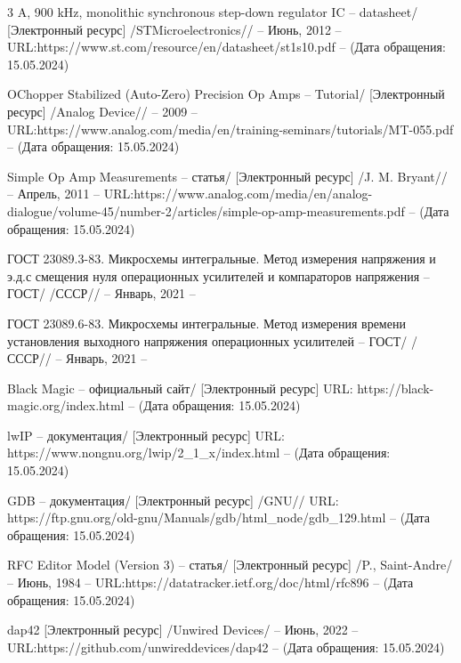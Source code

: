 \begin{thebibliography}{00}
 3 A, 900 kHz, monolithic synchronous step-down regulator IC
 -- datasheet/
  [Электронный ресурс]
 /STMicroelectronics// -- Июнь, 2012 -- 
 URL:https://www.st.com/resource/en/datasheet/st1s10.pdf --
 (Дата обращения: 15.05.2024)

 OChopper Stabilized (Auto-Zero) Precision Op Amps 
-- Tutorial/
[Электронный ресурс] /Analog Device// --  2009 -- 
URL:https://www.analog.com/media/en/training-seminars/tutorials/MT-055.pdf
-- (Дата обращения: 15.05.2024)

 Simple Op Amp Measurements
-- статья/
[Электронный ресурс] /J. M. Bryant// -- Апрель, 2011 -- 
URL:https://www.analog.com/media/en/analog-dialogue/volume-45/number-2/articles/simple-op-amp-measurements.pdf
-- (Дата обращения: 15.05.2024)

 ГОСТ 23089.3-83. Микросхемы интегральные. Метод измерения напряжения и э.д.с 
смещения нуля операционных усилителей и компараторов напряжения
-- ГОСТ/
 /СССР// -- Январь, 2021 -- 

 ГОСТ 23089.6-83. Микросхемы интегральные. Метод измерения времени установления выходного 
напряжения операционных усилителей 
-- ГОСТ/
 /СССР// -- Январь, 2021 -- 

 Black Magic
-- официальный сайт/
[Электронный ресурс]
URL: https://black-magic.org/index.html
-- (Дата обращения: 15.05.2024)

 lwIP
-- документация/
[Электронный ресурс]
URL: https://www.nongnu.org/lwip/2\_1\_x/index.html
-- (Дата обращения: 15.05.2024)

 GDB
-- документация/
[Электронный ресурс] /GNU//
URL: https://ftp.gnu.org/old-gnu/Manuals/gdb/html\_node/gdb\_129.html
-- (Дата обращения: 15.05.2024)

 RFC Editor Model (Version 3)
-- статья/
[Электронный ресурс] /P., Saint-Andre/ -- Июнь, 1984 --
URL:https://datatracker.ietf.org/doc/html/rfc896
-- (Дата обращения: 15.05.2024)

 dap42
[Электронный ресурс] /Unwired Devices/ -- Июнь, 2022 --
URL:https://github.com/unwireddevices/dap42
-- (Дата обращения: 15.05.2024)





\end{thebibliography}
